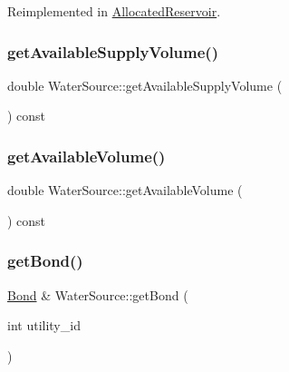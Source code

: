 Reimplemented in \mbox{\hyperlink{classAllocatedReservoir_ae161ebfc285aa69cb8b7f4fe20ee7a2e_ae161ebfc285aa69cb8b7f4fe20ee7a2e}{Allocated\+Reservoir}}.

\mbox{\label{classWaterSource_af6445a2dd3764907bcb9a37d4647f910_af6445a2dd3764907bcb9a37d4647f910}} 
\subsubsection{\texorpdfstring{get\+Available\+Supply\+Volume()}{getAvailableSupplyVolume()}}
{\footnotesize\ttfamily double Water\+Source\+::get\+Available\+Supply\+Volume (\begin{DoxyParamCaption}{ }\end{DoxyParamCaption}) const}

\mbox{\label{classWaterSource_a8eae3b16fc0f37780c1df827386f656e_a8eae3b16fc0f37780c1df827386f656e}} 
\subsubsection{\texorpdfstring{get\+Available\+Volume()}{getAvailableVolume()}}
{\footnotesize\ttfamily double Water\+Source\+::get\+Available\+Volume (\begin{DoxyParamCaption}{ }\end{DoxyParamCaption}) const}

\mbox{\label{classWaterSource_a22f89ebf1115de192df588a4fd83c671_a22f89ebf1115de192df588a4fd83c671}} 
\subsubsection{\texorpdfstring{get\+Bond()}{getBond()}}
{\footnotesize\ttfamily \mbox{\hyperlink{classBond}{Bond}} \& Water\+Source\+::get\+Bond (\begin{DoxyParamCaption}\item[{int}]{utility\+\_\+id }\end{DoxyParamCaption})}

